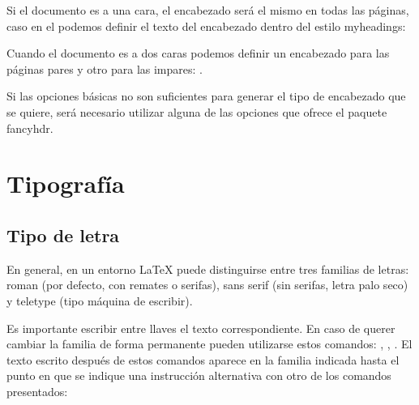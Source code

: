 \documentclass[11pt, a4paper]{article}
\begin{document}
Si el documento es a una cara, el encabezado será el mismo en todas las páginas, caso en el podemos definir el texto del encabezado dentro del estilo myheadings:


Cuando el documento es a dos caras podemos definir un encabezado para las páginas pares y otro para las impares: .

Si las opciones básicas no son suficientes para generar el tipo de encabezado que se quiere, será necesario utilizar alguna de las opciones que ofrece el paquete fancyhdr.

\section{Tipografía}

\subsection{Tipo de letra}

En general, en un entorno LaTeX puede distinguirse entre tres familias de letras: roman (por defecto, con remates o serifas), sans serif (sin serifas, letra palo seco) y teletype (tipo máquina de escribir).




Es importante escribir entre llaves el texto correspondiente. En caso de querer cambiar la familia de forma permanente pueden utilizarse estos comandos: , , . El texto escrito después de estos comandos aparece en la familia indicada hasta el punto en que se indique una instrucción alternativa con otro de los comandos presentados:






\end{document}
